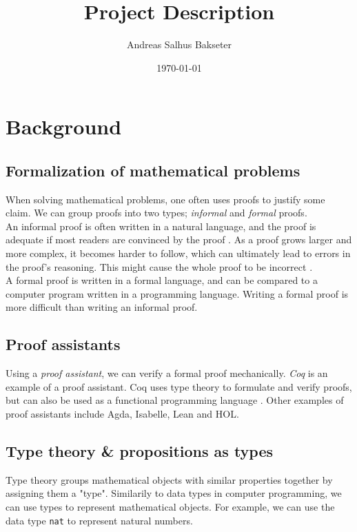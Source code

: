 \documentclass[a4paper,12pt]{article}
\title{\textbf{Project Description}}
\author{Andreas Salhus Bakseter}
\date{\today}
\begin{document}
\maketitle

\section{Background}

\subsection{Formalization of mathematical problems}

When solving mathematical problems, one often uses proofs
to justify some claim. We can group proofs into two types; \textit{informal} and \textit{formal} proofs.
\\

An informal proof is often written in a natural language, and the proof is adequate if most
readers are convinced by the proof \cite{bpierce}.
As a proof grows larger and more complex, it becomes harder to follow, which can
ultimately lead to errors in the proof's reasoning. This might cause the whole proof
to be incorrect \cite{rkhamsi}.
\\

A formal proof is written in a formal language, and can be compared to a computer program
written in a programming language. Writing a formal proof is more difficult than writing an informal proof.


\subsection{Proof assistants}

Using a \textit{proof assistant}, we can verify a formal proof mechanically.
\textit{Coq} is an example of a proof assistant. 
Coq uses type theory to formulate and verify proofs, but can also be used as a functional programming language \cite{cintro}.
Other examples of proof assistants include Agda, Isabelle, Lean and HOL.

\newpage

\subsection{Type theory \& propositions as types}

Type theory groups mathematical objects with similar properties together by assigning them a "type".
Similarily to data types in computer programming, we can use types to represent mathematical
objects. For example, we can use the data type \texttt{nat} to represent natural numbers.
\\
\end{document}
